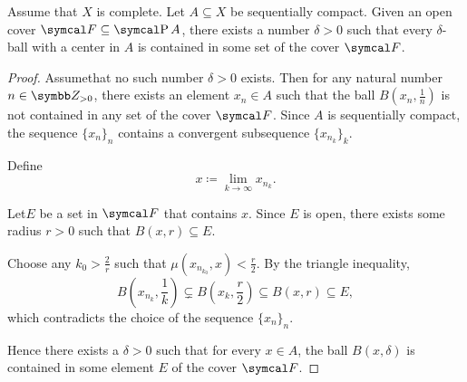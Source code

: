 \begin{lemma}\label{thm:lebesgue_covering_lemma}
  Assume that \( X \) is complete. Let \( A \subseteq X \) be sequentially compact. Given an open cover \( \Cal{F} \subseteq \Power A \), there exists a number \( \delta > 0 \) such that every \( \delta \)-ball with a center in \( A \) is contained in some set of the cover \( \Cal{F} \).
\end{lemma}
\begin{proof}
  Assume\LEM that no such number \( \delta > 0 \) exists. Then for any natural number \( n \in \Z_{>0} \), there exists an element \( x_n \in A \) such that the ball \( B(x_n, \frac 1 n) \) is not contained in any set of the cover \( \Cal{F} \). Since \( A \) is sequentially compact, the sequence \( \{ x_n \}_n \) contains a convergent subsequence \( \{ x_{n_k} \}_k \).

  Define
  \begin{equation*}
    x \coloneqq \lim_{k \to \infty} x_{n_k}.
  \end{equation*}

  Let\AOC \( E \) be a set in \( \Cal{F} \) that contains \( x \). Since \( E \) is open, there exists some radius \( r > 0 \) such that \( B(x, r) \subseteq E \).

  Choose any \( k_0 > \frac 2 r \) such that \( \mu(x_{n_{k_0}}, x) < \frac r 2 \). By the triangle inequality,
  \begin{equation*}
    B \left(x_{n_k}, \frac 1 k \right) \subsetneq B \left(x_k, \frac r 2 \right) \subseteq B(x, r) \subseteq E,
  \end{equation*}
  which contradicts the choice of the sequence \( \{ x_n \}_n \).

  Hence there exists a \( \delta > 0 \) such that for every \( x \in A \), the ball \( B(x, \delta) \) is contained in some element \( E \) of the cover \( \Cal{F} \).
\end{proof}

